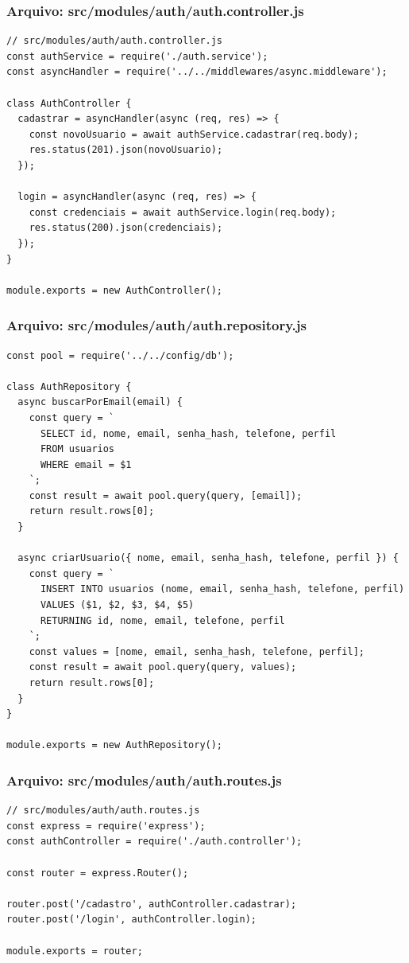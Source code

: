 \subsubsection*{Arquivo: src/modules/auth/auth.controller.js}
\begin{lstlisting}[caption={src/modules/auth/auth.controller.js}]
// src/modules/auth/auth.controller.js
const authService = require('./auth.service');
const asyncHandler = require('../../middlewares/async.middleware');

class AuthController {
  cadastrar = asyncHandler(async (req, res) => {
    const novoUsuario = await authService.cadastrar(req.body);
    res.status(201).json(novoUsuario);
  });

  login = asyncHandler(async (req, res) => {
    const credenciais = await authService.login(req.body);
    res.status(200).json(credenciais);
  });
}

module.exports = new AuthController();\end{lstlisting}
\vspace{0.5cm}
\subsubsection*{Arquivo: src/modules/auth/auth.repository.js}
\begin{lstlisting}[caption={src/modules/auth/auth.repository.js}]
const pool = require('../../config/db');

class AuthRepository {
  async buscarPorEmail(email) {
    const query = `
      SELECT id, nome, email, senha_hash, telefone, perfil 
      FROM usuarios 
      WHERE email = $1
    `;
    const result = await pool.query(query, [email]);
    return result.rows[0];
  }

  async criarUsuario({ nome, email, senha_hash, telefone, perfil }) {
    const query = `
      INSERT INTO usuarios (nome, email, senha_hash, telefone, perfil) 
      VALUES ($1, $2, $3, $4, $5) 
      RETURNING id, nome, email, telefone, perfil
    `;
    const values = [nome, email, senha_hash, telefone, perfil];
    const result = await pool.query(query, values);
    return result.rows[0];
  }
}

module.exports = new AuthRepository();
\end{lstlisting}
\vspace{0.5cm}
\subsubsection*{Arquivo: src/modules/auth/auth.routes.js}
\begin{lstlisting}[caption={src/modules/auth/auth.routes.js}]
// src/modules/auth/auth.routes.js
const express = require('express');
const authController = require('./auth.controller');

const router = express.Router();

router.post('/cadastro', authController.cadastrar);
router.post('/login', authController.login);

module.exports = router;\end{lstlisting}
\vspace{0.5cm}
